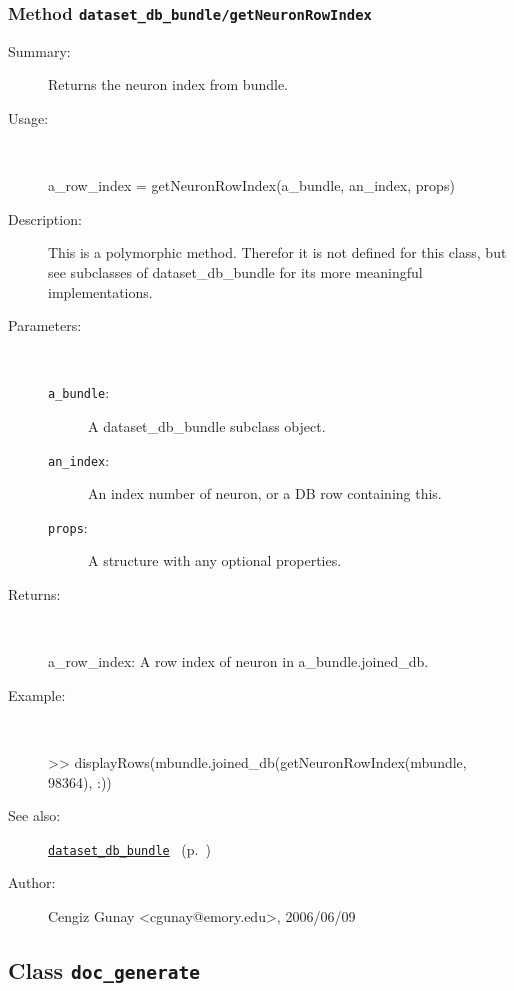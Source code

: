 \subsubsection[Method \texttt{getNeuronRowIndex}]{Method \texttt{dataset\_db\_bundle/getNeuronRowIndex}}%
%
\label{ref_dataset_db_bundle__getNeuronRowIndex}%
\hypertarget{ref_dataset_db_bundle__getNeuronRowIndex}{}%
\begin{description}
\item[Summary:]Returns the neuron index from bundle.
%
\item[Usage:]~%
\begin{lyxcode}%
a\_row\_index = getNeuronRowIndex(a\_bundle, an\_index, props)
%
\end{lyxcode}%
%
\item[Description:]%
This is a polymorphic method. Therefor it is not defined for this class, 
 but see subclasses of dataset\_db\_bundle for its more meaningful implementations.
\item[Parameters:]~
\begin{description}%
\item[\texttt{a\_bundle}:]
 A dataset\_db\_bundle subclass object.
\item[\texttt{an\_index}:]
 An index number of neuron, or a DB row containing this.
\item[\texttt{props}:]
 A structure with any optional properties.
\end{description}%
%
\item[Returns:]~

	a\_row\_index: A row index of neuron in a\_bundle.joined\_db.
%
\item[Example:]~
\begin{lyxcode} >> displayRows(mbundle.joined\_db(getNeuronRowIndex(mbundle, 98364), :))\\%
\end{lyxcode}
%
\item[See also:]%
\hyperlink{ref_dataset_db_bundle}{\texttt{dataset\_db\_bundle}}%
\ (p.~\pageref{ref_dataset_db_bundle})%
%
%
\item[Author:]%
Cengiz Gunay <cgunay@emory.edu>, 2006/06/09%
\end{description}
\methodline%
\subsection{Class \texttt{doc\_generate}}%
%
\label{ref_doc_generate}%
\hypertarget{ref_doc_generate}{}%
